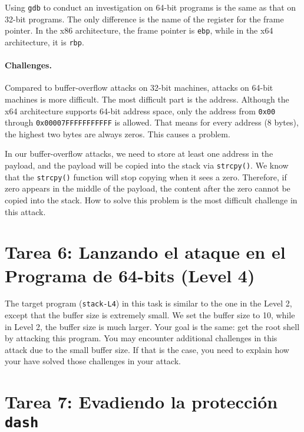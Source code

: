 Using \texttt{gdb} to conduct an investigation on 64-bit programs 
is the same as that on 32-bit programs.
The only difference is the name of the register for the frame pointer.
In the x86 architecture,
the frame pointer is \texttt{ebp}, while in the x64 architecture,
it is \texttt{rbp}. 


\paragraph{Challenges.} Compared to buffer-overflow attacks on 32-bit
machines, attacks on 64-bit machines is more difficult. The most
difficult part is the address. Although the x64 architecture
supports 64-bit address space, only the address from
\texttt{0x00} through \texttt{0x00007FFFFFFFFFFF} is allowed. That means for
every address (8 bytes), the highest two bytes are always zeros.
This causes a problem.

In our buffer-overflow attacks, we need to store at least one address
in the payload, and the payload will be copied into the stack via
\texttt{strcpy()}. We know that the \texttt{strcpy()} function
will stop copying when it sees a zero. Therefore, if zero
appears in the middle of the payload, the content after the
zero cannot be copied into the stack. How to solve this
problem is the most difficult challenge in this attack.




\section{Tarea 6: Lanzando el ataque en el Programa de 64-bits (Level 4)}


The target program (\texttt{stack-L4}) in this task is similar to the one in the Level 2,
except that the buffer size is extremely small. We set the 
buffer size to 10, while in Level 2, the buffer size is much larger. 
Your goal is the same: get the root shell by attacking this \setuid program. 
You may encounter additional challenges in this attack 
due to the small buffer size. 
If that is the case, you need to explain how your have solved 
those challenges in your attack. 



\section{Tarea 7: Evadiendo la protección \texttt{dash}}

